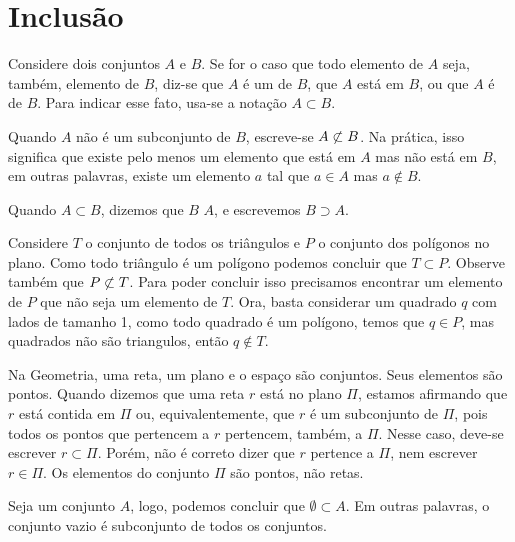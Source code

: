 \section{Inclusão}

\begin{definition}
Considere dois conjuntos $A$ e $B$.
Se for o caso que todo elemento de $A$ seja, também, elemento de $B$, diz-se que $A$ é um  de $B$, que $A$ está  em $B$, ou que $A$ é  de $B$.
Para indicar esse fato, usa-se a notação $A \subset B$.
\end{definition}

\begin{remark}
Quando $A$ não é um subconjunto de $B$, escreve-se $A \not\subset B$.
Na prática, isso significa que existe pelo menos um elemento que está em $A$ mas não está em $B$, em outras palavras, existe um elemento $a$ tal que $a \in A$ mas $a \notin B$.
\end{remark}

\begin{definition}
Quando $A \subset B$, dizemos que $B$  $A$, e escrevemos $B \supset A$.
\end{definition}

\begin{example}
Considere $T$ o conjunto de todos os triângulos e $P$ o conjunto dos polígonos no plano. Como todo triângulo é um polígono podemos concluir que $T \subset P$.
Observe também que $P \not\subset T$. Para poder concluir isso precisamos encontrar um elemento de $P$ que não seja um elemento de $T$. Ora, basta considerar um quadrado $q$ com lados de tamanho 1, como todo quadrado é um polígono, temos que $q \in P$, mas quadrados não são triangulos, então $q \notin T$.
\end{example}

\begin{example}
Na Geometria, uma reta, um plano e o espaço são conjuntos. Seus
elementos são pontos. Quando dizemos que uma reta $r$ está no plano $\Pi$, estamos afirmando que $r$ está contida em $\Pi$ ou, equivalentemente, que $r$ é um subconjunto de $\Pi$, pois todos os pontos que pertencem a $r$ pertencem, também, a $\Pi$. Nesse caso, deve-se escrever $ r \subset \Pi$. Porém, não é correto dizer que $r$ pertence a $\Pi$, nem escrever $r \in \Pi$. Os
elementos do conjunto $\Pi$ são pontos, não retas.
\end{example}

\begin{proposition}
Seja um conjunto $A$, logo, podemos concluir que $\emptyset \subset A$. Em outras palavras, o conjunto vazio é subconjunto de todos os conjuntos.
\end{proposition}

